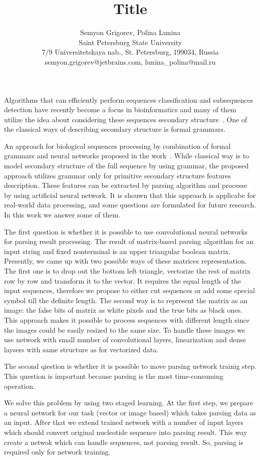 \documentclass[12pt]{article}  %
\title{Title}
\author{Semyon Grigorev, Polina Lunina
\\
       {Saint Petersburg State University}\\
       {7/9 Universitetskaya nab., St. Petersburg, 199034, Russia}\\
       semyon.grigorev@jetbrains.com, lunina\_polina@mail.ru
       }
\date{}
\theoremstyle{definition}
\theoremstyle{remark}
\begin{document}
\maketitle
Algorithms that can efficiently perform sequences classification and subsequences detection have recently become a focus in bioinformatics and many of them utilize the idea about considering these sequences secondary structure~\cite{GrammarsRNA, PCFG, meta, LWPCFG}. One of the classical ways of describing secondary structure is formal grammars.

An approach for biological sequences processing by combination of formal grammars and neural networks proposed in the work~\cite{grigorevcomposition}.
While classical way is to model secondary structure of the full sequence by using grammar, the proposed approach utilizes grammar only for primitive secondary structure features description. These features can be extracted by parsing algorithm and processe by using artificial neural network. It is shouwn that this approach is applicabe for real-world data processing, and some questions are formulated for future research. In this work we answer some of them.  

The first question is whether it is possible to use convolutional neural networks for parsing result processing. The result of matrix-based parsing algorithm for an input string and fixed nonterminal is an upper triangular boolean matrix. Presently, we came up with two possible ways of these matrices representation. The first one is to drop out the bottom left triangle, vectorize the rest of matrix row by row and transform it to the vector. It requires the equal length of the input sequences, therefore we propose to either cut sequences or add some special symbol till the definite length. The second way is to represent the matrix as an image: the false bits of matrix as white pixels and the true bits as black ones. This approach makes it possible to process sequences with different length since the images could be easily resized to the same size. 
To handle these images we use network with small number of convolutional layers, linearization and dense laysers with same structure as for vectorized data.

The second qiestion is whether it is possible to move parsing network trainig step. This question is important because parsing is the most time-consuming operation.

We solve this problem by using two staged learning. At the first step, we prepare a neural network for our task (vector or image based) which takes parsing data as an input. After that we extend trained network with a number of input layers which should convert original nucleotide sequence into parsing result. This way create a netwok which can handle sequences, not parsing result. So, parsing is required only for network training.
\end{document}
